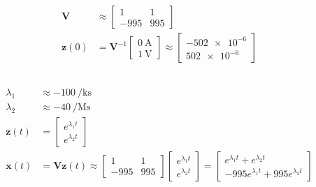 \documentclass[]{article}
\begin{document}
\subsection{}

\begin{align}
	\bm{V} &\approx \begin{bmatrix}
	1 & 1 \\
	-995 & 995
	\end{bmatrix} \\
	\bm{z}(0) &= \bm{V}^{-1} \begin{bmatrix}
	\SI{0}{\ampere} \\
	\SI{1}{\volt}
	\end{bmatrix} \approx
	\begin{bmatrix}
	\num{-502e-6} \\
	\num{502e-6}
	\end{bmatrix}
\end{align}

\subsection{}

\begin{align}
	\lambda_1 &\approx \SI{-100}{\per\kilo\second} \\
	\lambda_2 &\approx \SI{-40}{\per\mega\second} \\
	\bm{z}(t) &= \begin{bmatrix}
	e^{\lambda_1 t} \\
	e^{\lambda_2 t}
	\end{bmatrix} \\
	\bm{x}(t) &= \bm{V} \bm{z}(t) \approx
	\begin{bmatrix}
	1 & 1 \\
	-995 & 995
	\end{bmatrix}
	\begin{bmatrix}
	e^{\lambda_1 t} \\
	e^{\lambda_2 t}
	\end{bmatrix} =
	\begin{bmatrix}
	e^{\lambda_1 t} + e^{\lambda_2 t} \\
	-995 e^{\lambda_1 t} + 995 e^{\lambda_2 t}
	\end{bmatrix}
\end{align}

\subsection{}
\end{document}
